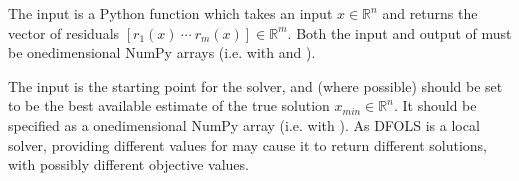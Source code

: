 \documentclass[letterpaper,10pt,english]{sphinxmanual}
\begin{document}
\sphinxAtStartPar
The input  is a Python function which takes an input \(x\in\mathbb{R}^n\) and returns the vector of residuals \([r_1(x)\: \cdots \: r_m(x)]\in\mathbb{R}^m\). Both the input and output of  must be one\sphinxhyphen{}dimensional NumPy arrays (i.e. with  and ).

\sphinxAtStartPar
The input  is the starting point for the solver, and (where possible) should be set to be the best available estimate of the true solution \(x_{min}\in\mathbb{R}^n\). It should be specified as a one\sphinxhyphen{}dimensional NumPy array (i.e. with ).
As DFO\sphinxhyphen{}LS is a local solver, providing different values for  may cause it to return different solutions, with possibly different objective values.
\end{document}
